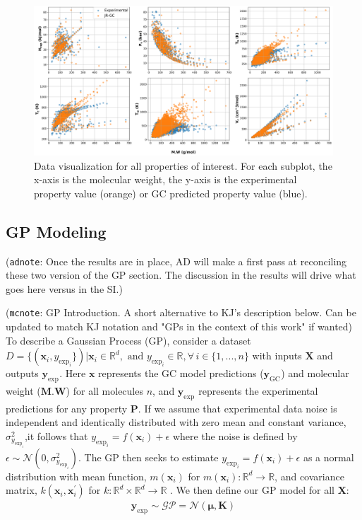 \documentclass[journal=jacsat,manuscript=article]{achemso}
\newcommand{\xvec}{\ensuremath{\mathbf{x}}}
\newcommand{\adnote}[1]{{\color{OliveGreen} (\texttt{adnote}: #1)}}
\newcommand{\mcnote}[1]{{\color{Plum} (\texttt{mcnote}: #1)}}
\newcommand{\Ygcvec}[1][]{\ensuremath{\mathbf{y}_{\text{GC}_{#1}}}}
\newcommand{\yexpvec}[1][]{\ensuremath{\mathbf{y}_{\text{exp}_{#1}}}}
\newcommand{\yexp}[1][]{\ensuremath{y_{\text{exp}_{#1}}}}
\begin{document}
\begin{figure}[H] %
    \centering
    \includegraphics[width=\textwidth]{"./MW_vs_Prop.png"} %
    \caption{Data visualization for all properties of interest. For each subplot, the x-axis is the molecular weight, the y-axis is the experimental property value (orange) or GC predicted property value (blue).}
    \label{fig:Data_Vis_Prop}
\end{figure}

\subsection{GP Modeling}

\adnote{Once the results are in place, AD will make a first pass at reconciling these two version of the GP section. The discussion in the results will drive what goes here versus in the SI.}

\mcnote{GP Introduction. A short alternative to KJ's description below. Can be updated to match KJ notation and "GPs in the context of this work" if wanted}
To describe a Gaussian Process (GP), consider a dataset $D = \{(\xvec_i, \yexp[i]\}) \vert \xvec_i \in \mathbb{R}^d, \text{ and } \yexp[i] \in \mathbb{R}, \forall \, i \in \{1,. . ., n\}$ with inputs $\mathbf{X}$ and outputs $\yexpvec[]$. Here $\xvec$ represents the GC model predictions ($\Ygcvec$) and molecular weight ($\textbf{M.W}$) for all molecules $n$, and $\yexpvec$ represents the experimental predictions for any property \textbf{P}. If we assume that experimental data noise is independent and identically distributed with zero mean and constant variance, $\sigma_{\yexp[i]}^2$,it follows that $\yexp[i] = f(\xvec_i) + \epsilon$ where the noise is defined by $\epsilon \sim \mathcal{N}(0,\sigma_{\yexp[i]}^2)$. The GP then seeks to estimate $\yexp[i] = f(\xvec_i) + \epsilon$ as a normal distribution with mean function, $m(\xvec_i)$ for $m(\xvec_i): \mathbb{R}^d \rightarrow \mathbb{R}$, and covariance matrix, $k(\xvec_i, \xvec_i^{\prime})$ for $k: \mathbb{R}^d \times \mathbb{R}^d \rightarrow \mathbb{R}$ \cite{Frazier2018AOptimization}. We then define our GP model for all $\mathbf{X}$:
\begin{gather*}
     \yexpvec \sim \mathcal{GP} = \mathcal{N}(\boldsymbol{\mu}, \mathbf{K})
\end{gather*}
\end{document}
